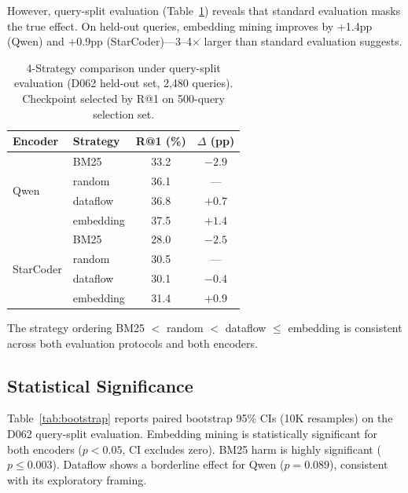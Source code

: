 \documentclass[11pt,a4paper]{article}
\begin{document}
However, query-split evaluation (Table~\ref{tab:main_querysplit}) reveals that standard evaluation masks the true effect. On held-out queries, embedding mining improves by +1.4pp (Qwen) and +0.9pp (StarCoder)---3--4$\times$ larger than standard evaluation suggests.

\begin{table}[t]
\centering
\small
\caption{4-Strategy comparison under query-split evaluation (D062 held-out set, 2,480 queries). Checkpoint selected by R@1 on 500-query selection set.}
\label{tab:main_querysplit}
\begin{tabular}{llcc}
\toprule
Encoder & Strategy & R@1 (\%) & $\Delta$ (pp) \\
\midrule
\multirow{4}{*}{Qwen} & BM25 & 33.2 & $-2.9$ \\
& random & 36.1 & --- \\
& dataflow & 36.8 & $+0.7$ \\
& embedding & 37.5 & $+1.4$ \\
\midrule
\multirow{4}{*}{StarCoder} & BM25 & 28.0 & $-2.5$ \\
& random & 30.5 & --- \\
& dataflow & 30.1 & $-0.4$ \\
& embedding & 31.4 & $+0.9$ \\
\bottomrule
\end{tabular}
\end{table}

The strategy ordering BM25 $<$ random $<$ dataflow $\leq$ embedding is consistent across both evaluation protocols and both encoders.

\subsection{Statistical Significance}
\label{sec:stats}

Table~\ref{tab:bootstrap} reports paired bootstrap 95\% CIs (10K resamples) on the D062 query-split evaluation. Embedding mining is statistically significant for both encoders ($p < 0.05$, CI excludes zero). BM25 harm is highly significant ($p \leq 0.003$). Dataflow shows a borderline effect for Qwen ($p = 0.089$), consistent with its exploratory framing.
\end{document}
